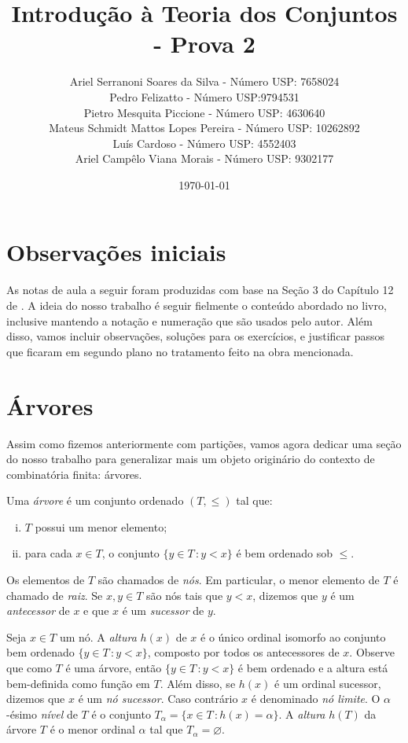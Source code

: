 \documentclass[a4paper]{article}
\title{Introdução à Teoria dos Conjuntos - Prova 2}
\author{Ariel Serranoni Soares da Silva  - Número USP: 7658024\\
Pedro Felizatto - Número USP:9794531\\
Pietro Mesquita Piccione - Número USP: 4630640\\
Mateus Schmidt Mattos Lopes Pereira - Número USP: 10262892\\
Luís Cardoso - Número USP: 4552403\\
Ariel Campêlo Viana Morais - Número USP: 9302177}
\date{\today}
\begin{document}
\maketitle
\section*{Observações iniciais}

As notas de aula a seguir foram produzidas com base na Seção 3 do Capítulo 12 de
\cite{jech}. A ideia do nosso trabalho é seguir fielmente o conteúdo abordado no
livro, inclusive mantendo a notação e numeração que são usados pelo autor.
Além disso, vamos incluir observações, soluções para os exercícios, e justificar
passos que ficaram em segundo plano no tratamento feito na obra mencionada.

\setcounter{section}{2}
\section{Árvores}

Assim como fizemos anteriormente com partições, vamos agora dedicar uma seção do
nosso trabalho para generalizar mais um objeto originário do
contexto de combinatória finita: árvores.

\begin{definition}
  Uma \emph{árvore} é um conjunto ordenado \((T,\leq)\) tal que:
 \begin{enumerate}[(i)]
  \item \(T\) possui um menor elemento;
  \item para cada \(x\in T\), o conjunto \(\{y\in T\,\colon y<x\}\) é bem
    ordenado sob \(\leq\).
  \end{enumerate}
\end{definition}
Os elementos de \(T\) são chamados de \emph{nós}. Em particular,
o menor elemento de \(T\) é chamado  de \emph{raiz}.
Se \(x,y\in T\) são nós tais que  \(y<x\), dizemos que \(y\) é um
\emph{antecessor} de \(x\) e que \(x\) é um \emph{sucessor} de \(y\).

Seja \(x\in T\) um nó.  A \emph{altura} \(h(x)\) de \(x\) é o único ordinal
isomorfo ao conjunto bem ordenado \mbox{\(\{y\in T\,\colon
y<x\}\),} composto por todos os antecessores de \(x\). Observe que como \(T\) é uma árvore,
então \(\{y\in T\,\colon y<x\}\) é bem ordenado e a altura está bem-definida como função em \(T\).
Além disso, se \(h(x)\) é um ordinal sucessor, dizemos que \(x\) é um
\emph{nó sucessor}. Caso contrário \(x\) é denominado \emph{nó limite}.
O \(\alpha\)-ésimo \emph{nível} de \(T\) é o conjunto
\(T_\alpha=\{x\in T \,\colon h(x)=\alpha\}\). A \emph{altura} \(h(T)\) da árvore
\(T\) é o menor ordinal \(\alpha\) tal que \(T_\alpha=\varnothing\).  
\end{document}
